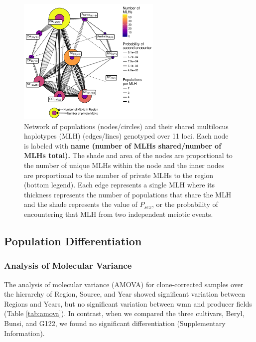 \documentclass[fleqn,10pt,lineno]{wlpeerj} %
\theoremstyle{definition}
\theoremstyle{definition}
\theoremstyle{definition}
\theoremstyle{remark}
\begin{document}
\begin{figure}
\centering
\includegraphics[width=0.61000\textwidth]{../../results/figures/publication/mlg-11.pdf}
\caption{Network of populations (nodes/circles) and their shared
multilocus haplotypes (MLH) (edges/lines) genotyped over 11 loci. Each
node is labeled with \textbf{name (number of MLHs shared/number of MLHs
total).} The shade and area of the nodes are proportional to the number
of unique MLHs within the node and the inner nodes are proportional to
the number of private MLHs to the region (bottom legend). Each edge
represents a single MLH where its thickness represents the number of
populations that share the MLH and the shade represents the value of
\(P_{sex}\), or the probability of encountering that MLH from two
independent meiotic events.}\label{community-graph}
\end{figure}

\subsection*{Population
Differentiation}\label{population-differentiation-1}

\subsubsection*{Analysis of Molecular
Variance}\label{analysis-of-molecular-variance}

The analysis of molecular variance (AMOVA) for clone-corrected samples
over the hierarchy of Region, Source, and Year showed significant
variation between Regions and Years, but no significant variation
between wmn and producer fields (Table \ref{tab:amova}). In contrast,
when we compared the three cultivars, Beryl, Bunsi, and G122, we found
no significant differentiation (Supplementary Information).
\end{document}
